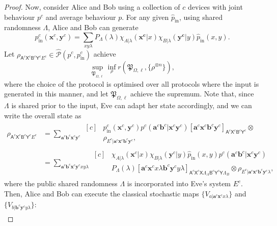 \documentclass[10pt, a4paper]{article}
\numberwithin{equation}{section} %
\theoremstyle{definition}
\theoremstyle{plain}
\newcommand{\?}{\mathrel{?}} %
\newcommand{\cvec}[1]{\boldsymbol{\mathbf{#1}}}    %
\newcommand{\crv}[1]{\mathsf{#1}}
\newcommand{\proj}[2][]{{[#2]}_{#1}}
\newcommand{\compatstates}[3][]{\hat{\mathcal{P}}#1(#2,#3)}
\newcommand{\proto}[2][_{\Omega,\ell}]{\mathfrak{#2}#1}
\newcommand{\prin}[1][p]{#1_{\mathrm{in}}}
\begin{document}
\begin{proof}
               Now, consider Alice and Bob using a collection of \(c\) devices with joint behaviour \(p^c\) and average behaviour \(p\). For any given \(\prin[\hat{p}]\), using shared randomness \(\Lambda\), Alice and Bob can generate
               \[ \prin^c(\cvec{x}^c, \cvec{y}^c) = \sum_{xy\lambda} P_{\Lambda}(\lambda) \chi_{A|\lambda}(\cvec{x^c}|x)\chi_{B|\lambda}(\cvec{y^c}|y) \prin[\hat{p}](x,y). \]
               Let \(\rho_{\crv{A}^c\crv{X}^c \crv{B}^c\crv{Y}^c E^c} \in \compatstates{p^c}{\prin^c}\) achieve
               \[ \sup_{\proto{P}} \inf_{\rho} r(\proto{P}, \{\rho^{\otimes n}\}), \]
               where the choice of the protocol is optimised over all protocols where the input is generated in this manner, and let \(\proto{P}\) achieve the supremum. Note that, since \(\Lambda\) is shared prior to the input, Eve can adapt her state accordingly, and we can write the overall state as
               \begin{align*}
                 \rho_{\crv{A}^c\crv{X}^c \crv{B}^c\crv{Y}^c E^c} &= \sum_{\cvec{a}^c\cvec{b}^c \cvec{x}^c\cvec{y}^c} \begin{aligned}[c]
          & \prin^c(\cvec{x}^c,\cvec{y}^c) p^c(\cvec{a}^c\cvec{b}^c|\cvec{x}^c\cvec{y}^c) \proj[\crv{A}^c\crv{X}^c \crv{B}^c\crv{Y}^c]{\cvec{a}^c\cvec{x}^c\cvec{b}^c\cvec{y}^c} \otimes \\
                    & \rho_{E^c|\cvec{a}^c\cvec{x}^c \cvec{b}^c\cvec{y}^c},
                 \end{aligned} \\
                                                                &= \sum_{\cvec{a}^c\cvec{b}^c \cvec{x}^c\cvec{y}^c xy\lambda} \begin{aligned}[c]
          & \chi_{A|\lambda}(\cvec{x}^c|x) \chi_{B|\lambda}(\cvec{y}^c|y) \prin[\hat{p}](x,y) p^c(\cvec{a}^c\cvec{b}^c|\cvec{x}^c\cvec{y}^c) \\
          & P_{\Lambda}(\lambda) \proj[\crv{A}^c\crv{X}^c\crv{X}\Lambda_A \crv{B}^c\crv{Y}^c\crv{Y}\Lambda_B]{\cvec{a}^c\cvec{x}^c{x}\lambda \cvec{b}^c\cvec{y}^c{y}\lambda} \otimes \rho_{E^c|\cvec{a}^c\cvec{x}^c \cvec{b}^c\cvec{y}^c\lambda},
                 \end{aligned}
                 \end{align*}
                 where the public shared randomness \(\Lambda\) is incorporated into Eve's system \(E^c\). Then, Alice and Bob can execute the classical stochastic maps \(\{V_{a|\cvec{a}^c\cvec{x}^c x\lambda}\}\) and \(\{V_{b|\cvec{b}^c\cvec{y}^c y\lambda}\}\):
                 \begin{align*}

\end{align*}
\end{proof}
\end{document}
